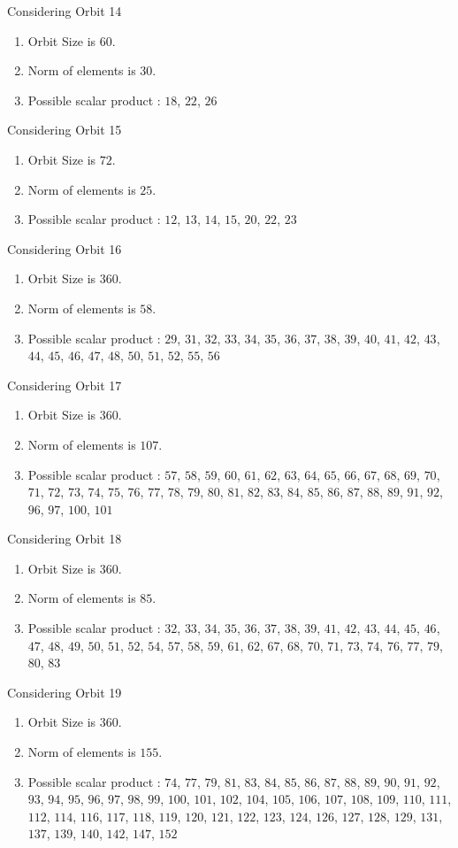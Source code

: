 \documentclass[12pt]{article}
\begin{document}
Considering Orbit 14
\begin{enumerate}
\item Orbit Size is $60$.
\item Norm of elements is $30$.
\item Possible scalar product : $18$, $22$, $26$
\end{enumerate}
Considering Orbit 15
\begin{enumerate}
\item Orbit Size is $72$.
\item Norm of elements is $25$.
\item Possible scalar product : $12$, $13$, $14$, $15$, $20$, $22$, $23$
\end{enumerate}
Considering Orbit 16
\begin{enumerate}
\item Orbit Size is $360$.
\item Norm of elements is $58$.
\item Possible scalar product : $29$, $31$, $32$, $33$, $34$, $35$, $36$, $37$, $38$, $39$, $40$, $41$, $42$, $43$, $44$, $45$, $46$, $47$, $48$, $50$, $51$, $52$, $55$, $56$
\end{enumerate}
Considering Orbit 17
\begin{enumerate}
\item Orbit Size is $360$.
\item Norm of elements is $107$.
\item Possible scalar product : $57$, $58$, $59$, $60$, $61$, $62$, $63$, $64$, $65$, $66$, $67$, $68$, $69$, $70$, $71$, $72$, $73$, $74$, $75$, $76$, $77$, $78$, $79$, $80$, $81$, $82$, $83$, $84$, $85$, $86$, $87$, $88$, $89$, $91$, $92$, $96$, $97$, $100$, $101$
\end{enumerate}
Considering Orbit 18
\begin{enumerate}
\item Orbit Size is $360$.
\item Norm of elements is $85$.
\item Possible scalar product : $32$, $33$, $34$, $35$, $36$, $37$, $38$, $39$, $41$, $42$, $43$, $44$, $45$, $46$, $47$, $48$, $49$, $50$, $51$, $52$, $54$, $57$, $58$, $59$, $61$, $62$, $67$, $68$, $70$, $71$, $73$, $74$, $76$, $77$, $79$, $80$, $83$
\end{enumerate}
Considering Orbit 19
\begin{enumerate}
\item Orbit Size is $360$.
\item Norm of elements is $155$.
\item Possible scalar product : $74$, $77$, $79$, $81$, $83$, $84$, $85$, $86$, $87$, $88$, $89$, $90$, $91$, $92$, $93$, $94$, $95$, $96$, $97$, $98$, $99$, $100$, $101$, $102$, $104$, $105$, $106$, $107$, $108$, $109$, $110$, $111$, $112$, $114$, $116$, $117$, $118$, $119$, $120$, $121$, $122$, $123$, $124$, $126$, $127$, $128$, $129$, $131$, $137$, $139$, $140$, $142$, $147$, $152$
\end{enumerate}
\end{document}
